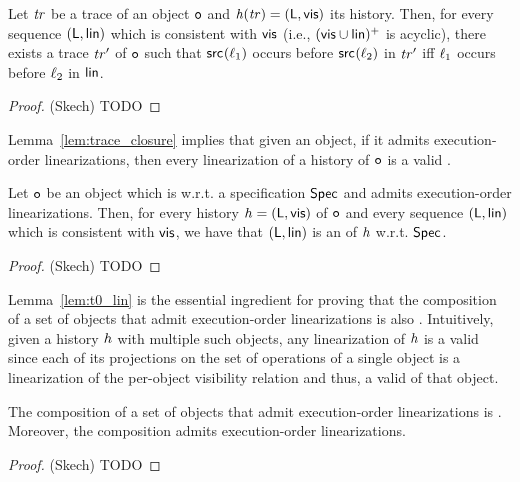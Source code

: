 \begin{lemma}\label{lem:trace_closure}
Let $\mathit{tr}$ be a trace of an object $\mathtt{o}$ and $\mathit{h}({\mathit{tr})}=(\mathsf{L},\mathsf{vis})$ its history. Then, for every sequence $(\mathsf{L},\mathsf{lin})$ which is consistent with $\mathsf{vis}$ (i.e., $(\mathsf{vis}
    \cup \mathsf{lin})^{+}$ is acyclic), there exists a trace $\mathit{tr}'$ of $\mathtt{o}$ such that $\mathsf{src}_{}(\ell_1)$ occurs before $\mathsf{src}_{}(\ell_2)$ in $\mathit{tr}'$ iff $\ell_1$ occurs before $\ell_2$ in $\mathsf{lin}$.
\end{lemma}
\begin{proof}(Skech)
TODO
\end{proof}

Lemma~\ref{lem:trace_closure} implies that given an \crdtlinearizable{} object, if it admits execution-order linearizations, then every linearization of a history of $\mathtt{o}$ is a valid \crdtlinearization{}.

\begin{lemma}\label{lem:t0_lin}
Let $\mathtt{o}$ be an object which is \crdtlinearizable{} w.r.t. a specification $\mathsf{Spec}$ and admits execution-order linearizations. Then, for every history ${h}=(\mathsf{L},\mathsf{vis})$ of $\mathtt{o}$ and every sequence $(\mathsf{L},\mathsf{lin})$ which is consistent with $\mathsf{vis}$, we have that $(\mathsf{L},\mathsf{lin})$ is an \crdtlinearization{} of ${h}$ w.r.t. $\mathsf{Spec}$.
\end{lemma}
\begin{proof}(Skech)
TODO
\end{proof}

Lemma~\ref{lem:t0_lin} is the essential ingredient for proving that the composition of a set of \crdtlinearizable{} objects that admit execution-order linearizations is also \crdtlinearizable{}. Intuitively, given a history ${h}$ with multiple such objects, any linearization of ${h}$ is a valid \crdtlinearization{} since each of its projections on the set of operations of a single object is a linearization of the per-object visibility relation and thus, a valid \crdtlinearization{} of that object.

\begin{theorem}
The composition of a set of \crdtlinearizable{} objects that admit execution-order linearizations is \crdtlinearizable{}. Moreover, the composition admits execution-order linearizations.
\end{theorem}
\begin{proof}(Skech)
TODO
\end{proof}


